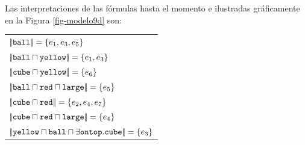 




Las interpretaciones de las f\'ormulas hasta el momento e ilustradas gr\'aficamente en la Figura \ref{fig-modelo9d} son:

\begin{tabular}{l}
$|\!| \texttt{ball}|\!| = \{e_1, e_3, e_5\}$ \\
$|\!|\texttt{ball} \sqcap \texttt{yellow}|\!| = \{e_1, e_3\}$\\
$|\!|\texttt{cube} \sqcap \texttt{yellow} |\!|= \{e_6\}$ \\
$|\!|\texttt{ball} \sqcap \texttt{red} \sqcap \texttt{large}|\!| = \{e_5\}$ \\
$|\!|\texttt{cube} \sqcap \texttt{red} |\!|= \{e_2, e_4, e_7\}$ \\
$|\!|\texttt{cube} \sqcap \texttt{red} \sqcap \texttt{large}|\!| = \{e_4\}$  \\
$|\!|\texttt{yellow} \sqcap \texttt{ball} \sqcap \exists \texttt{ontop}.\texttt{cube}|\!| = \{e_3\} $
\end{tabular}



